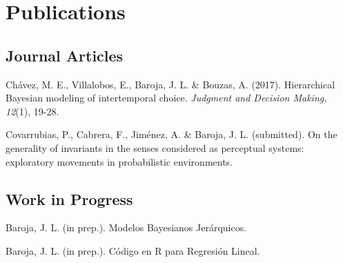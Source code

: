 \documentclass[letterpaper]{article}
\renewenvironment{itemize}{
  \begin{list}{}{
    \setlength{\leftmargin}{1.5em}
  }
}{
  \end{list}
}
\begin{document}
\section*{Publications}



 \subsection*{Journal Articles}
\begin{itemize}
\setlength\itemsep{-.25em}
\setlength{\itemindent}{-.125in}
	\item Chávez, M. E., Villalobos, E., Baroja, J. L. \& Bouzas, A. (2017). Hierarchical Bayesian modeling of intertemporal choice. \emph{Judgment and Decision Making, 12}(1), 19-28.
	\item Covarrubias, P., Cabrera, F., Jiménez, A. \& Baroja, J. L. (submitted). On the generality of invariants in the senses considered as perceptual systems: exploratory movements in probabilistic environments.
\end{itemize}

 \subsection*{Work in Progress}
\begin{itemize}
\setlength\itemsep{-.25em}
\setlength{\itemindent}{-.125in}
	\item Baroja, J. L. (in prep.). Modelos Bayesianos Jerárquicos.
	\item Baroja, J. L. (in prep.). Código en R para Regresión Lineal.
\end{itemize}
\end{document}
